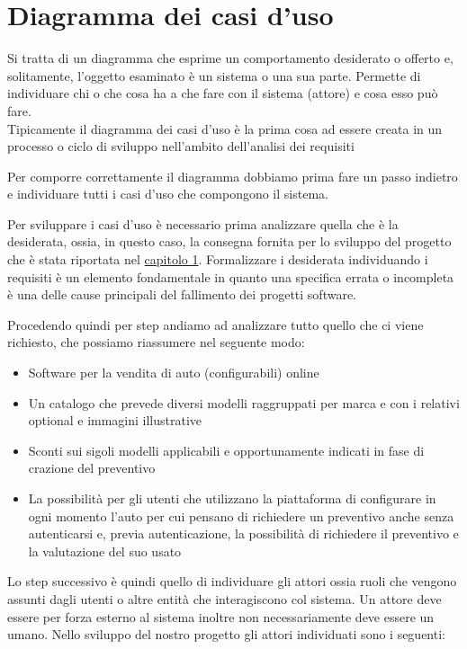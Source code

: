 \documentclass[a4paper, 11pt,oneside]{book}
\newcommand{\spacing}{\par\bigskip\noindent}
\begin{document}
    \section{Diagramma dei casi d'uso}
        Si tratta di un diagramma che esprime un comportamento desiderato o offerto e, solitamente, l'oggetto esaminato è un sistema o una sua parte. Permette di individuare chi o che cosa ha a che fare con il sistema (attore) e cosa
        esso può fare.\\
        Tipicamente il diagramma dei casi d'uso è la prima cosa ad essere creata in un processo o ciclo di sviluppo nell'ambito dell'analisi dei requisiti
        \spacing
        Per comporre correttamente il diagramma dobbiamo prima fare un passo indietro e individuare tutti i casi d'uso che compongono il sistema.
        \spacing
        Per sviluppare i casi d'uso è necessario prima analizzare quella che è la desiderata, ossia, in questo caso, la consegna fornita per lo sviluppo del progetto che è stata riportata nel \hyperlink{chapter.1}{capitolo 1}. Formalizzare i desiderata
        individuando i requisiti è un elemento fondamentale in quanto una specifica errata o incompleta è una delle cause principali del fallimento dei progetti software.
        \spacing
        Procedendo quindi per step andiamo ad analizzare tutto quello che ci viene richiesto, che possiamo riassumere nel seguente modo:
        \begin{itemize}
            \item Software per la vendita di auto (configurabili) online
            \item Un catalogo che prevede diversi modelli raggruppati per marca e con i relativi optional e immagini illustrative
            \item Sconti sui sigoli modelli applicabili e opportunamente indicati in fase di crazione del preventivo
            \item La possibilità per gli utenti che utilizzano la piattaforma di configurare in ogni momento l'auto per cui pensano di richiedere un preventivo anche senza autenticarsi e, previa autenticazione, la possibilità
            di richiedere il preventivo e la valutazione del suo usato
        \end{itemize}
        Lo step successivo è quindi quello di individuare gli attori ossia ruoli che vengono assunti dagli utenti o altre entità che interagiscono col sistema. Un attore deve essere per forza esterno al sistema inoltre non necessariamente deve essere un
        umano. Nello sviluppo del nostro progetto gli attori individuati sono i seguenti:
\end{document}
